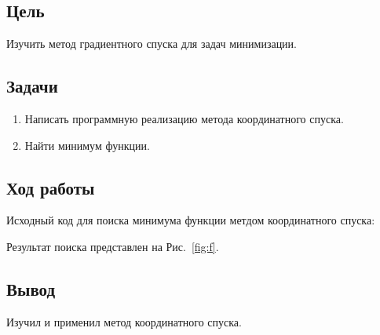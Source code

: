 


    
\newcommand{\labn}{8}


\subsection*{Цель}

Изучить метод градиентного спуска для задач минимизации.

\subsection*{Задачи}

\begin{enumerate}
    \item Написать программную реализацию метода координатного спуска.
    \item Найти минимум функции.
\end{enumerate}

\subsection*{Ход работы}

Исходный код для поиска минимума функции метдом координатного спуска:

Результат поиска представлен на Рис.~\ref{fig:f}.

\subsection*{Вывод}

Изучил и применил метод координатного спуска.



